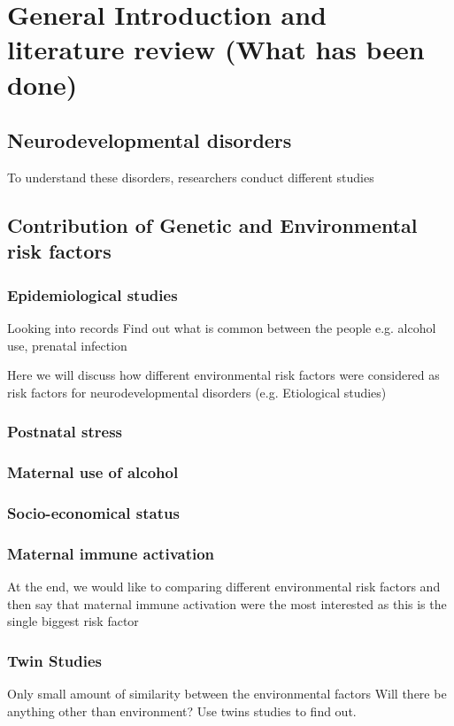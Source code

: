 \chapter{General Introduction and literature review (What has been done)}
\section{Neurodevelopmental disorders}

To understand these disorders, researchers conduct different studies
\section{Contribution of Genetic and Environmental risk factors}
\subsection{Epidemiological studies}
Looking into records
Find out what is common between the people
e.g. alcohol use, prenatal infection

Here we will discuss how different environmental risk factors were considered as risk factors for neurodevelopmental disorders (e.g. Etiological studies)
\subsection{Postnatal stress}
\subsection{Maternal use of alcohol}
\subsection{Socio-economical status}
\subsection{Maternal immune activation}
At the end, we would like to comparing different environmental risk factors and then say that maternal immune activation were the most interested as this is the single biggest risk factor

\subsection{Twin Studies}
Only small amount of similarity between the environmental factors
Will there be anything other than environment?
Use twins studies to find out.

